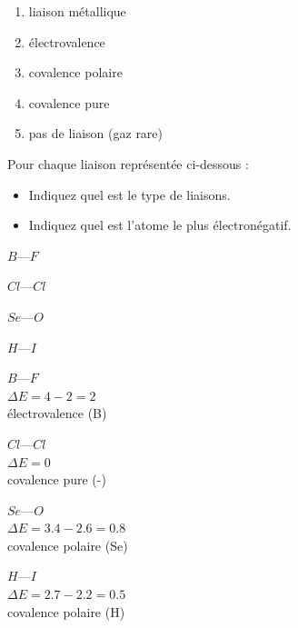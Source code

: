 \documentclass[
  11pt,
  a4paper,
  openany]{book}
\providecommand{\tightlist}{%
  \setlength{\itemsep}{0pt}\setlength{\parskip}{0pt}}
\begin{document}
\begin{Answer}

\begin{enumerate}
\def\labelenumi{\alph{enumi}.}
\tightlist
\item
  liaison métallique
\item
  électrovalence
\item
  covalence polaire
\item
  covalence pure
\item
  pas de liaison (gaz rare)
\end{enumerate}

\end{Answer}

\newpage

\begin{Exercise}

Pour chaque liaison représentée ci-dessous :

\begin{itemize}
\tightlist
\item
  Indiquez quel est le type de liaisons.
\item
  Indiquez quel est l'atome le plus électronégatif.
\end{itemize}

\begin{multicols}{4}
\(B—F\)

\(Cl—Cl\)

\(Se—O\)

\(H—I\)

\end{multicols}


\end{Exercise}

\begin{Answer}

\begin{multicols}{2}
\(B—F\)\\
\(\Delta E = 4 - 2 = 2\)\\
électrovalence (B)

\(Cl—Cl\)\\
\(\Delta E = 0\)\\
covalence pure (-)

\(Se—O\)\\
\(\Delta E = 3.4 - 2.6 = 0.8\)\\
covalence polaire (Se)

\(H—I\)\\
\(\Delta E = 2.7 - 2.2 = 0.5\)\\
covalence polaire (H)

\end{multicols}

\end{Answer}
\end{document}

